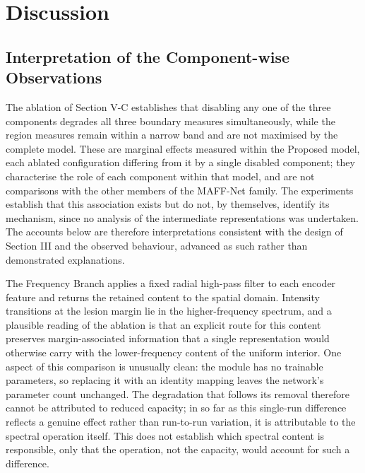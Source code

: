 \section{Discussion}
\label{sec:discussion}

\subsection{Interpretation of the Component-wise Observations}

The ablation of Section V-C establishes that disabling any one of the three components degrades all three boundary measures simultaneously, while the region measures remain within a narrow band and are not maximised by the complete model. These are marginal effects measured within the Proposed model, each ablated configuration differing from it by a single disabled component; they characterise the role of each component within that model, and are not comparisons with the other members of the MAFF-Net family. The experiments establish that this association exists but do not, by themselves, identify its mechanism, since no analysis of the intermediate representations was undertaken. The accounts below are therefore interpretations consistent with the design of Section III and the observed behaviour, advanced as such rather than demonstrated explanations.

The Frequency Branch applies a fixed radial high-pass filter to each encoder feature and returns the retained content to the spatial domain. Intensity transitions at the lesion margin lie in the higher-frequency spectrum, and a plausible reading of the ablation is that an explicit route for this content preserves margin-associated information that a single representation would otherwise carry with the lower-frequency content of the uniform interior. One aspect of this comparison is unusually clean: the module has no trainable parameters, so replacing it with an identity mapping leaves the network's parameter count unchanged. The degradation that follows its removal therefore cannot be attributed to reduced capacity; in so far as this single-run difference reflects a genuine effect rather than run-to-run variation, it is attributable to the spectral operation itself. This does not establish which spectral content is responsible, only that the operation, not the capacity, would account for such a difference.

